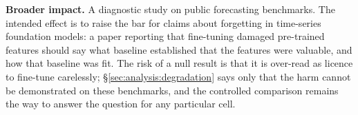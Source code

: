 \textbf{Broader impact.} A diagnostic study on public forecasting benchmarks.
The intended effect is to
raise the bar for claims about forgetting in time-series foundation models: a
paper reporting that fine-tuning damaged pre-trained features should say what
baseline established that the features were valuable, and how that baseline
was fit.  The risk of a null result is that it is over-read as licence to
fine-tune carelessly; \S\ref{sec:analysis:degradation} says only that the harm
cannot be demonstrated on these benchmarks, and the controlled comparison
remains the way to answer the question for any particular cell.
